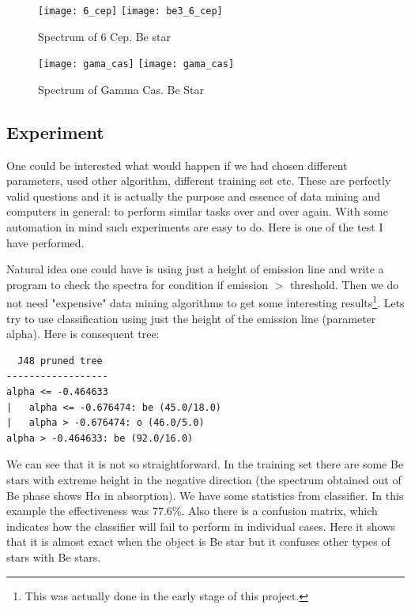    \begin{figure}[!htbp]
      \begin{center}
        \leavevmode
        \ifpdf
        \texttt{[image: 6\_cep]}
        \else
        \texttt{[image: be3\_6\_cep]}
        \fi
        \caption{Spectrum of 6 Cep. Be star}
        \label{FigBe3}
      \end{center}
    \end{figure}

  \begin{figure}[!htbp]
      \begin{center} 
        \leavevmode
        \ifpdf
        \texttt{[image: gama\_cas]}
        \else
        \texttt{[image: gama\_cas]}
        \fi     
        \caption{Spectrum of Gamma Cas. Be Star}
        \label{FigBe4}
      \end{center}
    \end{figure}




\subsection{Experiment}

One could be interested what would happen if we had chosen different
parameters, used other algorithm, different training set etc. These
are perfectly valid questions and it is actually the purpose and
essence of data mining and computers in general: to perform similar
tasks over and over again. With some automation in mind such
experiments are easy to do. Here is one of the test I have performed.

Natural idea one could have is using just a height of emission line
and write a program to check the spectra for condition \textrm{if
  emission $>$ threshold}. Then we do not need "expensive" data mining
algorithms to get some interesting results\footnote{This was actually
  done in the early stage of this project.}. Lets try to use
classification using just the height of the emission line (parameter
alpha). Here is consequent tree:


\begin{lstlisting}
  J48 pruned tree
------------------
alpha <= -0.464633
|   alpha <= -0.676474: be (45.0/18.0)
|   alpha > -0.676474: o (46.0/5.0)
alpha > -0.464633: be (92.0/16.0)
\end{lstlisting}

We can see that it is not so straightforward. In the training set
there are some Be stars with extreme height in the negative direction
(the spectrum obtained out of Be phase shows H$\alpha$ in
absorption). We have some statistics from classifier. In this example
the effectiveness was $77.6$\%. Also there is a confusion matrix,
which indicates how the classifier will fail to perform in individual
cases. Here it shows that it is almost exact when the object is Be
star but it confuses other types of stars with Be stars.

